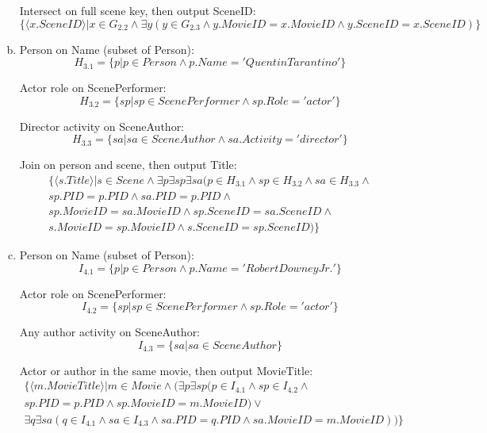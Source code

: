 \documentclass{article}
\begin{document}
\begin{enumerate}[(a)]
Intersect on full scene key, then output SceneID:
\begin{equation}
\{\langle x.SceneID \rangle | x \in G_{2.2} \land \exists y(y \in G_{2.3} \land y.MovieID=x.MovieID \land y.SceneID=x.SceneID) \}
\end{equation}

\item
Person on Name (subset of Person):
\begin{equation}
H_{3.1} = \{ p | p \in Person \land p.Name='Quentin Tarantino' \}
\end{equation}

Actor role on ScenePerformer:
\begin{equation}
H_{3.2} = \{ sp | sp \in ScenePerformer \land sp.Role='actor' \}
\end{equation}

Director activity on SceneAuthor:
\begin{equation}
H_{3.3} = \{ sa | sa \in SceneAuthor \land sa.Activity='director' \}
\end{equation}

Join on person and scene, then output Title:
\begin{multline}
\{ \langle s.Title \rangle | s \in Scene \land \exists p\exists sp\exists sa(p \in H_{3.1} \land sp \in H_{3.2} \land sa \in H_{3.3} \land {}\\
 sp.PID=p.PID \land sa.PID=p.PID \land \\
 sp.MovieID=sa.MovieID \land sp.SceneID=sa.SceneID \land \\
 s.MovieID=sp.MovieID \land s.SceneID=sp.SceneID ) \}
\end{multline}

\item
Person on Name (subset of Person):
\begin{equation}
I_{4.1} = \{ p | p \in Person \land p.Name='Robert Downey Jr.' \}
\end{equation}

Actor role on ScenePerformer:
\begin{equation}
I_{4.2} = \{ sp | sp \in ScenePerformer \land sp.Role='actor' \}
\end{equation}

Any author activity on SceneAuthor:
\begin{equation}
I_{4.3} = \{ sa | sa \in SceneAuthor \}
\end{equation}

Actor or author in the same movie, then output MovieTitle:
\begin{multline}
\{ \langle m.MovieTitle \rangle | m \in Movie \land (\exists p\exists sp(p \in I_{4.1} \land sp \in I_{4.2} \land \\
 sp.PID=p.PID \land sp.MovieID=m.MovieID) \lor {}\\
\exists q\exists sa(q \in I_{4.1} \land sa \in I_{4.3} \land sa.PID=q.PID \land sa.MovieID=m.MovieID)
) \}
\end{multline}


\end{enumerate}
\end{document}
